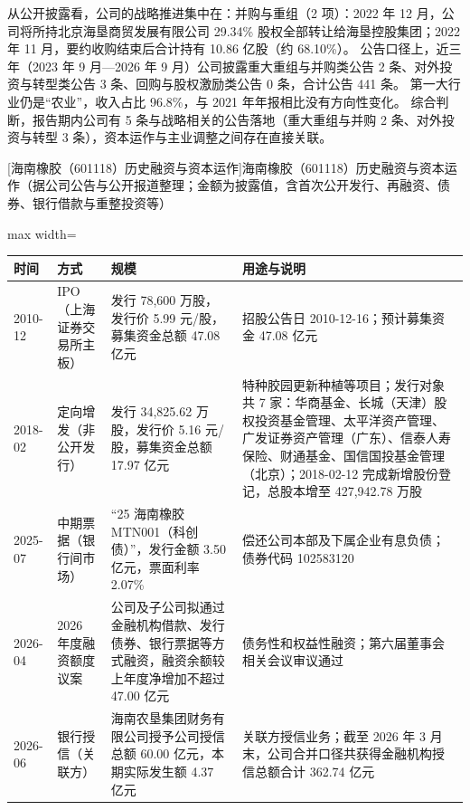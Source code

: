  从公开披露看，公司的战略推进集中在：并购与重组（2 项）：2022 年 12 月，公司将所持北京海垦商贸发展有限公司 29.34\% 股权全部转让给海垦控股集团；2022 年 11 月，要约收购结束后合计持有 10.86 亿股（约 68.10\%）。 公告口径上，近三年（2023 年 9 月---2026 年 9 月）公司披露重大重组与并购类公告 2 条、对外投资与转型类公告 3 条、回购与股权激励类公告 0 条，合计公告 441 条。 第一大行业仍是“农业”，收入占比 96.8\%，与 2021 年年报相比没有方向性变化。 综合判断，报告期内公司有 5 条与战略相关的公告落地（重大重组与并购 2 条、对外投资与转型 3 条），资本运作与主业调整之间存在直接关联。

\begin{center}\small\setlength{\tabcolsep}{4pt}
[海南橡胶（601118）历史融资与资本运作]{海南橡胶（601118）历史融资与资本运作（据公司公告与公开报道整理；金额为披露值，含首次公开发行、再融资、债券、银行借款与重整投资等）}
\begin{adjustbox}{max width=\textwidth}
\begin{tabular}{@{}p{1.45cm}p{2.55cm}p{4.05cm}p{4.95cm}@{}}
\toprule
时间 & 方式 & 规模 & 用途与说明 \\
\midrule
2010-12 & IPO（上海证券交易所主板） & 发行 78,\allowbreak{}600 万股，\allowbreak{}发行价 5.99 元/\allowbreak{}股，\allowbreak{}募集资金总额 47.08 亿元 & 招股公告日 2010-12-16；预计募集资金 47.08 亿元 \\
2018-02 & 定向增发（非公开发行） & 发行 34,\allowbreak{}825.62 万股，\allowbreak{}发行价 5.16 元/\allowbreak{}股，\allowbreak{}募集资金总额 17.97 亿元 & 特种胶园更新种植等项目；发行对象共 7 家：华商基金、\allowbreak{}长城（天津）股权投资基金管理、\allowbreak{}太平洋资产管理、\allowbreak{}广发证券资产管理（广东）、\allowbreak{}信泰人寿保险、\allowbreak{}财通基金、\allowbreak{}国信国投基金管理（北京）；2018-02-12 完成新增股份登记，\allowbreak{}总股本增至 427,\allowbreak{}942.78 万股 \\
2025-07 & 中期票据（银行间市场） & “25 海南橡胶 MTN001（科创债）”，\allowbreak{}发行金额 3.50 亿元，\allowbreak{}票面利率 2.07\% & 偿还公司本部及下属企业有息负债；债券代码 102583120 \\
2026-04 & 2026 年度融资额度议案 & 公司及子公司拟通过金融机构借款、\allowbreak{}发行债券、\allowbreak{}银行票据等方式融资，\allowbreak{}融资余额较上年度净增加不超过 47.00 亿元 & 债务性和权益性融资；第六届董事会相关会议审议通过 \\
2026-06 & 银行授信（关联方） & 海南农垦集团财务有限公司授予公司授信总额 60.00 亿元，\allowbreak{}本期实际发生额 4.37 亿元 & 关联方授信业务；截至 2026 年 3 月末，\allowbreak{}公司合并口径共获得金融机构授信总额合计 362.74 亿元 \\
\bottomrule
\end{tabular}
\end{adjustbox}
\end{center}

